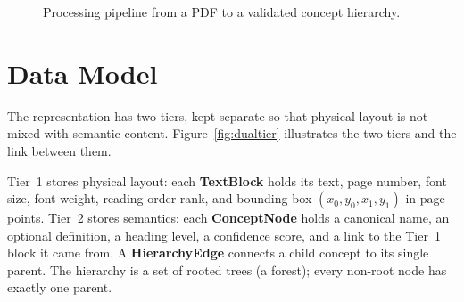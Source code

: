 \documentclass[12pt,a4paper,twoside,openright]{report}
\begin{document}
\begin{figure}[!htbp]
\centering
{}
\caption{Processing pipeline from a PDF to a validated concept hierarchy.}
\label{fig:pipeline}
\end{figure}

\section{Data Model}
The representation has two tiers, kept separate so that physical layout is not mixed
with semantic content. Figure~\ref{fig:dualtier} illustrates the two tiers and the link
between them.

Tier~1 stores physical layout: each \textbf{TextBlock} holds its text, page number, font
size, font weight, reading-order rank, and bounding box $(x_0, y_0, x_1, y_1)$ in page points.
Tier~2 stores semantics: each \textbf{ConceptNode} holds a canonical name, an optional
definition, a heading level, a confidence score, and a link to the Tier~1 block it came from.
A \textbf{HierarchyEdge} connects a child concept to its single parent. The hierarchy is a
set of rooted trees (a forest); every non-root node has exactly one parent.
\end{document}
